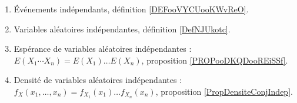     \label{THEMEooProbaIndependance}

\begin{enumerate}
	\item
	      Événements indépendants, définition \ref{DEFooVYCUooKWvReO}.
	\item
	      Variables aléatoires indépendantes, définition \ref{DefNJUkotc}.
	\item
	      Espérance de variables aléatoires indépendantes : \( E(X_1\cdots X_n)=E(X_1)\ldots E(X_n)\), proposition \ref{PROPooDKQDooREiSSf}.
	\item
	      Densité de variables aléatoires indépendantes : \( f_X(x_1,\ldots,x_n)=f_{X_1}(x_1)\ldots f_{X_n}(x_n)\), proposition \ref{PropDensiteConjIndep}.
\end{enumerate}
